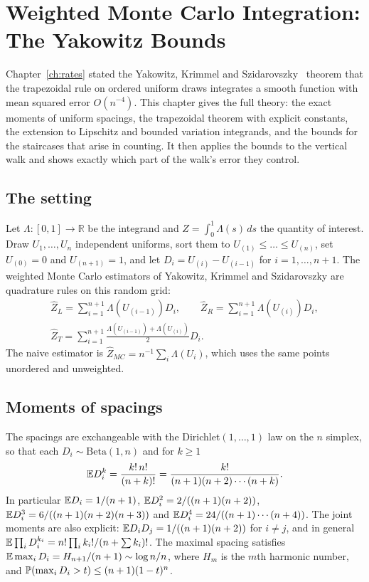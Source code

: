 \chapter{Weighted Monte Carlo Integration: The Yakowitz Bounds}
\label{ch:yakowitz}

Chapter~\ref{ch:rates} stated the Yakowitz, Krimmel and Szidarovszky~\cite{YKS} theorem that the trapezoidal rule on ordered uniform draws integrates a smooth function with mean squared error $O(n^{-4})$. This chapter gives the full theory: the exact moments of uniform spacings, the trapezoidal theorem with explicit constants, the extension to Lipschitz and bounded variation integrands, and the bounds for the staircases that arise in counting. It then applies the bounds to the vertical walk and shows exactly which part of the walk's error they control.

\section{The setting}

Let $\Lambda : [0, 1] \to \mathbb{R}$ be the integrand and $Z = \int_0^1 \Lambda(s) \, ds$ the quantity of interest. Draw $U_1, \dots, U_n$ independent uniforms, sort them to $U_{(1)} \le \dots \le U_{(n)}$, set $U_{(0)} = 0$ and $U_{(n+1)} = 1$, and let $D_i = U_{(i)} - U_{(i-1)}$ for $i = 1, \dots, n+1$. The weighted Monte Carlo estimators of Yakowitz, Krimmel and Szidarovszky are quadrature rules on this random grid:
\[
\begin{gathered}
\hat Z_L = \sum_{i=1}^{n+1} \Lambda(U_{(i-1)}) D_i , \qquad
\hat Z_R = \sum_{i=1}^{n+1} \Lambda(U_{(i)}) D_i , \\
\hat Z_T = \sum_{i=1}^{n+1} \frac{\Lambda(U_{(i-1)}) + \Lambda(U_{(i)})}{2} D_i .
\end{gathered}
\]
The naive estimator is $\hat Z_{MC} = n^{-1} \sum_i \Lambda(U_i)$, which uses the same points unordered and unweighted.

\section{Moments of spacings}

The spacings are exchangeable with the Dirichlet$(1, \dots, 1)$ law on the $n$ simplex, so that each $D_i \sim \mathrm{Beta}(1, n)$ and for $k \ge 1$
\[
\mathbb{E} D_i^k = \frac{k! \, n!}{(n + k)!} = \frac{k!}{(n+1)(n+2) \cdots (n+k)} .
\]
In particular $\mathbb{E} D_i = 1/(n+1)$, $\mathbb{E} D_i^2 = 2/((n+1)(n+2))$, $\mathbb{E} D_i^3 = 6/((n+1)(n+2)(n+3))$ and $\mathbb{E} D_i^4 = 24/((n+1) \cdots (n+4))$. The joint moments are also explicit: $\mathbb{E} D_i D_j = 1/((n+1)(n+2))$ for $i \neq j$, and in general $\mathbb{E} \prod_i D_i^{k_i} = n! \prod_i k_i! / (n + \sum k_i)!$. The maximal spacing satisfies $\mathbb{E} \max_i D_i = H_{n+1}/(n+1) \sim \log n / n$, where $H_m$ is the $m$th harmonic number, and $\mathbb{P}( \max_i D_i > t ) \le (n+1)(1 - t)^n$.


